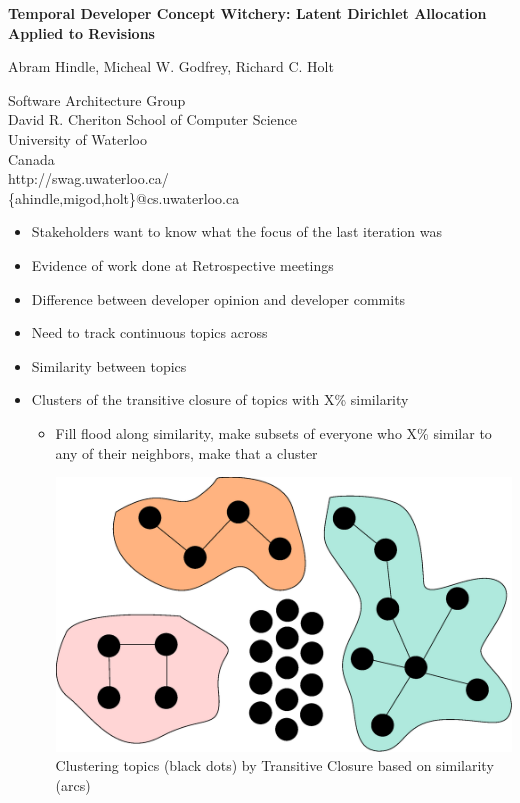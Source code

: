 \documentclass[titlepage,usenames,a4,landscape,semhelv]{seminar}
\author{
\names \\ 
{\small Software Architecture Group }\\
\small David R. Cheriton School of Computer Science\\
\small University of Waterloo\\
\small Canada\\
ahindle@cs.uwaterloo.ca
}
\newcommand{\gettitle}{Temporal Developer Concept Witchery: Latent Dirichlet Allocation Applied to Revisions}
\newcommand{\gettitleproper}{\gettitle}
\newcommand{\names}{Abram Hindle, Micheal W. Godfrey, Richard C. Holt}
\begin{document}
\pagestyle{fancy} %
\begin{slide}

\begin{center}
{\bf \LARGE \gettitleproper }

{\names } 

{\small Software Architecture Group }\\[-.5em]
{\small David R. Cheriton School of Computer Science}\\[-.5em]
{\small University of Waterloo}\\[-.5em]
{\small Canada}\\[-.5em]
{\small http://swag.uwaterloo.ca/}\\
\{ahindle,migod,holt\}@cs.uwaterloo.ca


\end{center}

\begin{itemize}
\item Stakeholders want to know what the focus of the last iteration was
\item Evidence of work done at Retrospective meetings
\item Difference between developer opinion and developer commits

\end{itemize}
\begin{itemize}
\item Need to track continuous topics across 
\item Similarity between topics
\item Clusters of the transitive closure of topics with X\% similarity
	\begin{itemize}
	\item Fill flood along similarity, make subsets of everyone who X\% similar to any of their neighbors, make that a cluster

\newslide


\begin{center}
\includegraphics[width=\textwidth]{transitiveclosure}
Clustering topics (black dots) by Transitive Closure based on similarity (arcs)
\end{center}



\end{itemize}
\end{itemize}
\end{slide}
\end{document}
